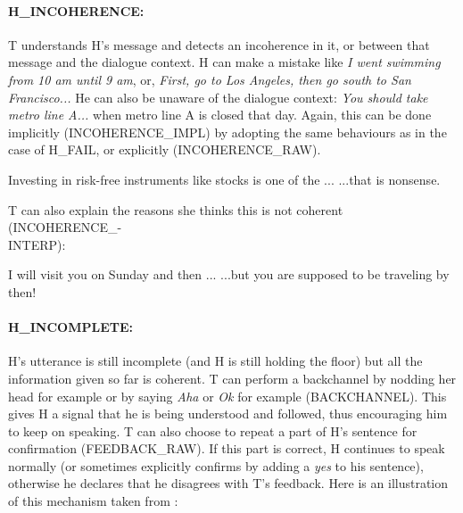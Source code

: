 				\paragraph{H\_INCOHERENCE:} T understands H's message and detects an incoherence in it, or between that message and the dialogue context. H can make a mistake like \textit{I went swimming from 10 am until 9 am}, or, \textit{First, go to Los Angeles, then go south to San Francisco...} He can also be unaware of the dialogue context: \textit{You should take metro line A...} when metro line A is closed that day. Again, this can be done implicitly (INCOHERENCE\_IMPL) by adopting the same behaviours as in the case of H\_FAIL, or explicitly (INCOHERENCE\_RAW).
					
						\begin{dialogue}
							 Investing in risk-free instruments like stocks is one of the ...
							 ...that is nonsense.
						\end{dialogue}
						
						T can also explain the reasons she thinks this is not coherent (INCOHERENCE\_-\\INTERP):
						
						\begin{dialogue}
							 I will visit you on Sunday and then ...
							 ...but you are supposed to be traveling by then!
						\end{dialogue}
						
					\paragraph{H\_INCOMPLETE:} H's utterance is still incomplete (and H is still holding the floor) but all the information given so far is coherent. T can perform a backchannel by nodding her head for example or by saying \textit{Aha} or \textit{Ok} for example (BACKCHANNEL). This gives H a signal that he is being understood and followed, thus encouraging him to keep on speaking. T can also choose to repeat a part of H's sentence for confirmation (FEEDBACK\_RAW). If this part is correct, H continues to speak normally (or sometimes explicitly confirms by adding a \textit{yes} to his sentence), otherwise he declares that he disagrees with T's feedback. Here is an illustration of this mechanism taken from \cite{Khouzaimi2014a}:
					
